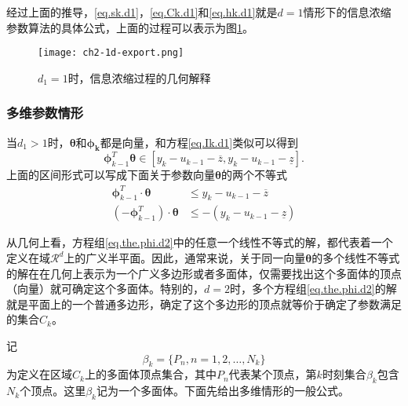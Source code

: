 经过上面的推导，\eqref{eq.sk.d1}，\eqref{eq.Ck.d1}和\eqref{eq.hk.d1}就是$d=1$情形下的信息浓缩参数算法的具体公式，上面的过程可以表示为图\ref{fig.1d.export}。
\begin{figure}
	\centering
	\texttt{[image: ch2-1d-export.png]}\\	 %
	\caption{$d_{1}=1$时，信息浓缩过程的几何解释}
	\label{fig.1d.export}
\end{figure}

\subsubsection{多维参数情形}\label{subsubsect:2.3.3.2}
当$d_{1}>1$时，$\bm{\theta}$和$\bm{\phi_{k}}$都是向量，和方程\eqref{eq.Ik.d1}类似可以得到
\begin{equation}%
\label{eq.the.phi.d2}
\bm{\phi}_{k-1}^{T}\bm{\theta}\in[y_{k}-u_{k-1}-\overline{z},y_{k}-u_{k-1}-\underline{z}].
\end{equation}
上面的区间形式可以写成下面关于参数向量$\bm{\theta}$的两个不等式
\begin{equation}%
\label{eq.the.phi.d2}
\begin{split}%
\bm{\phi}_{k-1}^{T}\cdot\bm{\theta}&\leq y_{k}-u_{k-1}-\overline{z}\\
(-\bm{\phi}_{k-1}^{T})\cdot\bm{\theta}&\leq -(y_{k}-u_{k-1}-\underline{z})
\end{split}
\end{equation}

从几何上看，方程组\eqref{eq.the.phi.d2}中的任意一个线性不等式的解，都代表着一个定义在域$\mathcal{R}^{d}$上的广义半平面。因此，通常来说，关于同一向量$\bm{\theta}$的多个线性不等式的解在在几何上表示为一个广义多边形或者多面体，仅需要找出这个多面体的顶点（向量）就可确定这个多面体。特别的，$d=2$时，多个方程组\eqref{eq.the.phi.d2}的解就是平面上的一个普通多边形，确定了这个多边形的顶点就等价于确定了参数满足的集合$C_{k}$。

记
\begin{equation}%
\label{eq.Vk}
\beta_{k}=\{P_{n},n=1,2,\ldots,N_{k}\}
\end{equation}
为定义在区域$C_{k}$上的多面体顶点集合，其中$P_{n}$代表某个顶点，第$k$时刻集合$\beta_{k}$包含$N_{k}$个顶点。这里$\beta_{k}$记为一个多面体。下面先给出多维情形的一般公式。

